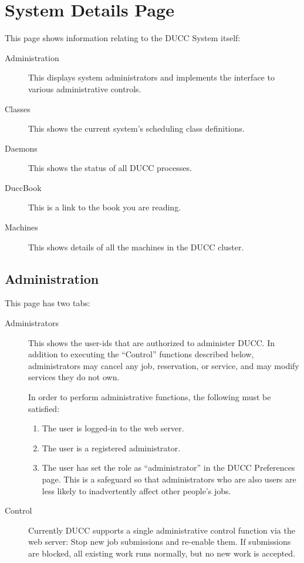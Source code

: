 
\section{System  Details Page}
\label{sec:system-details}

This page shows information relating to the DUCC System itself:
\begin{description}
  \item[Administration]This displays system administrators and implements
    the interface to various administrative controls.
  \item[Classes] This shows the current system's scheduling class definitions.
  \item[Daemons] This shows the status of all DUCC processes.
  \item[DuccBook] This is a link to the book you are reading.
  \item[Machines] This shows details of all the machines in the DUCC cluster.
\end{description}

\subsection{Administration}

   This page has two tabs:
   \begin{description}   
     \item[Administrators] This shows the user-ids that are authorized to administer
       DUCC.  In addition to executing the ``Control'' functions described below,
       administrators may cancel any job, reservation, or service, and may modify
       services they do not own.  

       In order to perform administrative functions, the following must be satisfied:
       \begin{enumerate}
         \item The user is logged-in to the web server.
         \item The user is a registered administrator.
         \item The user has set the role as ``administrator'' in the DUCC Preferences
           page.  This is a safeguard so that administrators who are also users
           are less likely to inadvertently affect other people's jobs.
       \end{enumerate}
     \item[Control] Currently DUCC supports a single administrative control function
       via the web server: Stop new job submissions and re-enable them.  If submissions
       are blocked, all existing work runs normally, but no new work is accepted.
     \end{description}



